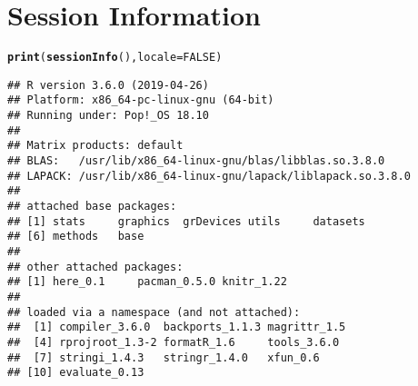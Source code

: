 \documentclass[11pt,letter]{article}\usepackage[]{graphicx}\usepackage[]{color}
\makeatletter
\newcommand{\hlnum}[1]{\textcolor[rgb]{0.686,0.059,0.569}{#1}}%
\newcommand{\hlstd}[1]{\textcolor[rgb]{0.345,0.345,0.345}{#1}}%
\newcommand{\hlkwc}[1]{\textcolor[rgb]{0.333,0.667,0.333}{#1}}%
\newcommand{\hlkwd}[1]{\textcolor[rgb]{0.737,0.353,0.396}{\textbf{#1}}}%
\newenvironment{kframe}{%
 \def\at@end@of@kframe{}%
 \ifinner\ifhmode%
  \def\at@end@of@kframe{\end{minipage}}%
  \begin{minipage}{\columnwidth}%
 \fi\fi%
 \def\FrameCommand##1{\hskip\@totalleftmargin \hskip-\fboxsep
 \colorbox{shadecolor}{##1}\hskip-\fboxsep
     \hskip-\linewidth \hskip-\@totalleftmargin \hskip\columnwidth}%
 \MakeFramed {\advance\hsize-\width
   \@totalleftmargin\z@ \linewidth\hsize
   \@setminipage}}%
 {\par\unskip\endMakeFramed%
 \at@end@of@kframe}
\newenvironment{knitrout}{}{} %
\makeatother
\begin{document}
\section{Session Information}
\begin{knitrout}
\color{fgcolor}\begin{kframe}
\begin{alltt}
\hlkwd{print}\hlstd{(}\hlkwd{sessionInfo}\hlstd{(),} \hlkwc{locale} \hlstd{=} \hlnum{FALSE}\hlstd{)}
\end{alltt}
\begin{verbatim}
## R version 3.6.0 (2019-04-26)
## Platform: x86_64-pc-linux-gnu (64-bit)
## Running under: Pop!_OS 18.10
## 
## Matrix products: default
## BLAS:   /usr/lib/x86_64-linux-gnu/blas/libblas.so.3.8.0
## LAPACK: /usr/lib/x86_64-linux-gnu/lapack/liblapack.so.3.8.0
## 
## attached base packages:
## [1] stats     graphics  grDevices utils     datasets 
## [6] methods   base     
## 
## other attached packages:
## [1] here_0.1     pacman_0.5.0 knitr_1.22  
## 
## loaded via a namespace (and not attached):
##  [1] compiler_3.6.0  backports_1.1.3 magrittr_1.5   
##  [4] rprojroot_1.3-2 formatR_1.6     tools_3.6.0    
##  [7] stringi_1.4.3   stringr_1.4.0   xfun_0.6       
## [10] evaluate_0.13
\end{verbatim}
\end{kframe}
\end{knitrout}
\end{document}
